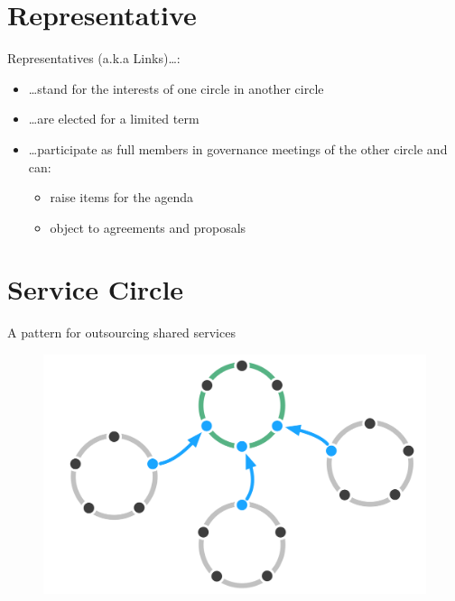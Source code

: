 \section{Representative}
\label{representative}

Representatives (a.k.a Links){\ldots}:

\begin{itemize}
\item {\ldots}stand for the interests of one circle in another circle

\item {\ldots}are elected for a limited term

\item {\ldots}participate as full members in governance meetings of the other circle and can:

\begin{itemize}
\item raise items for the agenda

\item object to agreements and proposals

\end{itemize}

\end{itemize}

\section{Service Circle}
\label{servicecircle}

A pattern for outsourcing shared services

\begin{figure}[htbp]
\centering
\includegraphics[keepaspectratio,width=\textwidth,height=0.75\textheight]{img/structural-patterns/service-circle.png}
\end{figure}

